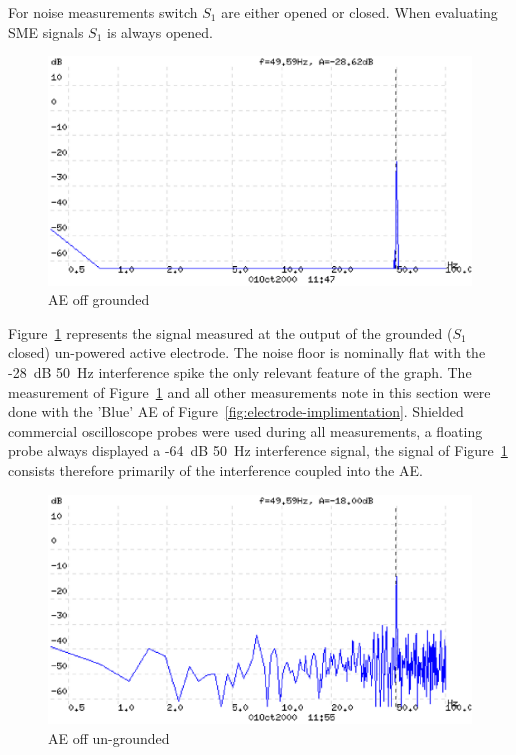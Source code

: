 For noise measurements switch $S_1$ are either opened or closed. When
evaluating SME signals $S_1$ is always opened.

\begin{figure}[htbp]
\begin{center}
	\includegraphics[width=\textwidth]{AE1OF.ps}
	\caption{AE off grounded}
	\label{fig:ae1-n}
\end{center}
\end{figure}
 
Figure~\ref{fig:ae1-n} represents the signal measured at the output of
the grounded ($S_1$ closed) un-powered active electrode. The noise
floor is nominally flat with the -28~dB 50~Hz interference spike the
only relevant feature of the graph. The measurement of
Figure~\ref{fig:ae1-n} and all other measurements note in this section
were done with the 'Blue' AE of
Figure~\ref{fig:electrode-implimentation}. Shielded commercial
oscilloscope probes were used during all measurements, a floating
probe always displayed a -64~dB 50~Hz interference signal, the signal
of Figure~\ref{fig:ae1-n} consists therefore primarily of the
interference coupled into the AE.


\begin{figure}[htbp]
\begin{center}
	\includegraphics[width=\textwidth]{AE2OFOP.ps}
	\caption{AE off un-grounded}
	\label{fig:ae2-n}
\end{center}
\end{figure}

